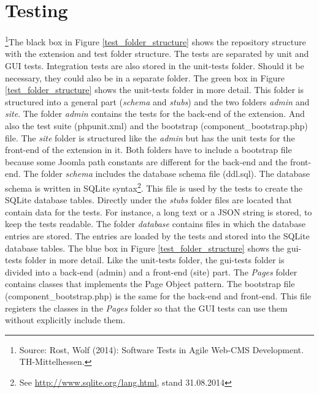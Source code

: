 \section{Testing}
\footnote{Source: Rost, Wolf (2014): Software Tests in Agile Web-CMS Development. TH-Mittelhessen.}The black box in Figure \ref{test_folder_structure} shows the repository structure with the extension and test folder structure. The tests are separated by unit and GUI tests. Integration tests are also stored in the unit-tests folder. Should it be necessary, they could also be in a separate folder. The green box in Figure \ref{test_folder_structure}  shows the unit-tests folder in more detail. This folder is structured into a general part (\textit{schema} and \textit{stubs}) and the two folders \textit{admin} and \textit{site}. The folder \textit{admin} contains the tests for the back-end of the extension. And also the test suite (phpunit.xml) and the bootstrap (component\_bootstrap.php) file. The \textit{site} folder is structured like the \textit{admin} but has the unit tests for the front-end of the extension in it. Both folders have to include a bootstrap file because some Joomla path constants are different for the back-end and the front-end. \newline
The folder \textit{schema} includes the database schema file (ddl.sql). The database schema is written in SQLite syntax\footnote{See \url{http://www.sqlite.org/lang.html}, stand 31.08.2014}. This file is used by the tests to create the SQLite database tables. \newline
Directly under the \textit{stubs} folder files are located that contain data for the tests. For instance, a long text or a JSON string is stored, to keep the tests readable. The folder \textit{database} contains files in which the database entries are stored. The entries are loaded by the tests and stored into the SQLite database tables. \newline
The blue box in Figure \ref{test_folder_structure} shows the gui-tests folder in more detail. Like the unit-tests folder, the gui-tests folder is divided into a back-end (admin) and a front-end (site) part. The \textit{Pages} folder contains classes that implements the Page Object pattern. The bootstrap file (component\_bootstrap.php) is the same for the back-end and front-end. This file registers the classes in the \textit{Pages} folder so that the GUI tests can use them without explicitly include them.

